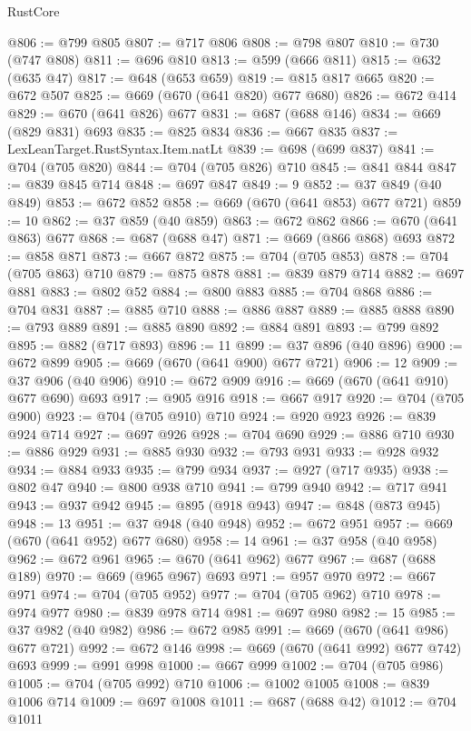 \begin{lexlean}{RustCore}
\begin{coremodule}
@806 := @799 @805
@807 := @717 @806
@808 := @798 @807
@810 := @730 (@747 @808)
@811 := @696 @810
@813 := @599 (@666 @811)
@815 := @632 (@635 @47)
@817 := @648 (@653 @659)
@819 := @815 @817 @665
@820 := @672 @507
@825 := @669 (@670 (@641 @820) @677 @680)
@826 := @672 @414
@829 := @670 (@641 @826) @677
@831 := @687 (@688 @146)
@834 := @669 (@829 @831) @693
@835 := @825 @834
@836 := @667 @835
@837 := LexLeanTarget.RustSyntax.Item.natLt
@839 := @698 (@699 @837)
@841 := @704 (@705 @820)
@844 := @704 (@705 @826) @710
@845 := @841 @844
@847 := @839 @845 @714
@848 := @697 @847
@849 := 9
@852 := @37 @849 (@40 @849)
@853 := @672 @852
@858 := @669 (@670 (@641 @853) @677 @721)
@859 := 10
@862 := @37 @859 (@40 @859)
@863 := @672 @862
@866 := @670 (@641 @863) @677
@868 := @687 (@688 @47)
@871 := @669 (@866 @868) @693
@872 := @858 @871
@873 := @667 @872
@875 := @704 (@705 @853)
@878 := @704 (@705 @863) @710
@879 := @875 @878
@881 := @839 @879 @714
@882 := @697 @881
@883 := @802 @52
@884 := @800 @883
@885 := @704 @868
@886 := @704 @831
@887 := @885 @710
@888 := @886 @887
@889 := @885 @888
@890 := @793 @889
@891 := @885 @890
@892 := @884 @891
@893 := @799 @892
@895 := @882 (@717 @893)
@896 := 11
@899 := @37 @896 (@40 @896)
@900 := @672 @899
@905 := @669 (@670 (@641 @900) @677 @721)
@906 := 12
@909 := @37 @906 (@40 @906)
@910 := @672 @909
@916 := @669 (@670 (@641 @910) @677 @690) @693
@917 := @905 @916
@918 := @667 @917
@920 := @704 (@705 @900)
@923 := @704 (@705 @910) @710
@924 := @920 @923
@926 := @839 @924 @714
@927 := @697 @926
@928 := @704 @690
@929 := @886 @710
@930 := @886 @929
@931 := @885 @930
@932 := @793 @931
@933 := @928 @932
@934 := @884 @933
@935 := @799 @934
@937 := @927 (@717 @935)
@938 := @802 @47
@940 := @800 @938 @710
@941 := @799 @940
@942 := @717 @941
@943 := @937 @942
@945 := @895 (@918 @943)
@947 := @848 (@873 @945)
@948 := 13
@951 := @37 @948 (@40 @948)
@952 := @672 @951
@957 := @669 (@670 (@641 @952) @677 @680)
@958 := 14
@961 := @37 @958 (@40 @958)
@962 := @672 @961
@965 := @670 (@641 @962) @677
@967 := @687 (@688 @189)
@970 := @669 (@965 @967) @693
@971 := @957 @970
@972 := @667 @971
@974 := @704 (@705 @952)
@977 := @704 (@705 @962) @710
@978 := @974 @977
@980 := @839 @978 @714
@981 := @697 @980
@982 := 15
@985 := @37 @982 (@40 @982)
@986 := @672 @985
@991 := @669 (@670 (@641 @986) @677 @721)
@992 := @672 @146
@998 := @669 (@670 (@641 @992) @677 @742) @693
@999 := @991 @998
@1000 := @667 @999
@1002 := @704 (@705 @986)
@1005 := @704 (@705 @992) @710
@1006 := @1002 @1005
@1008 := @839 @1006 @714
@1009 := @697 @1008
@1011 := @687 (@688 @42)
@1012 := @704 @1011

\end{coremodule}
\end{lexlean}
